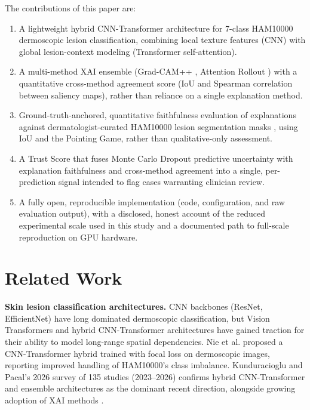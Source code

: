\documentclass[conference]{IEEEtran}
\begin{document}
The contributions of this paper are:
\begin{enumerate}
\item A lightweight hybrid CNN-Transformer architecture for 7-class HAM10000 dermoscopic
lesion classification, combining local texture features (CNN) with global lesion-context
modeling (Transformer self-attention).
\item A multi-method XAI ensemble (Grad-CAM++ \cite{chattopadhyay2018}, Attention Rollout
\cite{abnar2020}) with a quantitative cross-method agreement score (IoU and Spearman
correlation between saliency maps), rather than reliance on a single explanation method.
\item Ground-truth-anchored, quantitative faithfulness evaluation of explanations against
dermatologist-curated HAM10000 lesion segmentation masks \cite{tschandl2020}, using IoU and
the Pointing Game, rather than qualitative-only assessment.
\item A Trust Score that fuses Monte Carlo Dropout predictive uncertainty
\cite{gal2016} with explanation faithfulness and cross-method agreement into a single,
per-prediction signal intended to flag cases warranting clinician review.
\item A fully open, reproducible implementation (code, configuration, and raw evaluation
output), with a disclosed, honest account of the reduced experimental scale used in this
study and a documented path to full-scale reproduction on GPU hardware.
\end{enumerate}

\section{Related Work}

\textbf{Skin lesion classification architectures.} CNN backbones (ResNet, EfficientNet) have
long dominated dermoscopic classification, but Vision Transformers \cite{dosovitskiy2021}
and hybrid CNN-Transformer architectures have gained traction for their ability to model
long-range spatial dependencies. Nie et al. \cite{nie2022} proposed a CNN-Transformer hybrid
trained with focal loss on dermoscopic images, reporting improved handling of HAM10000's
class imbalance. Kunduracioglu and Pacal's 2026 survey of 135 studies (2023--2026) confirms
hybrid CNN-Transformer and ensemble architectures as the dominant recent direction, alongside
growing adoption of XAI methods \cite{kunduracioglu2026}.
\end{document}
